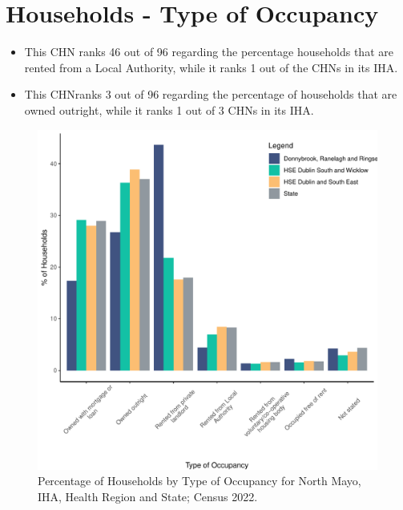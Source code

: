 \documentclass{article}
\begin{document}
\section{Households - Type of Occupancy}\label{sect:Households}
\begin{itemize}
\item This CHN ranks  46 out of 96 regarding the percentage households that are rented from a Local Authority, while it ranks  1 out of the CHNs in its IHA. 
\item This CHNranks  3 out of 96 regarding the percentage of households that are owned outright, while it ranks   1 out of 3 CHNs in its IHA.
\end{itemize}
\begin{figure}[H]
	\centering
	\includegraphics[width = 140mm]{../figures/HouseholdsED.pdf}
	\caption{Percentage of Households by Type of Occupancy for North Mayo, IHA, Health Region and State; Census 2022.}
	\label{fig:vbnv}
	\end{figure}
\end{document}
